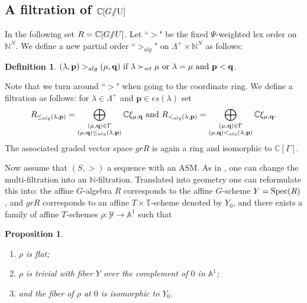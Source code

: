 \documentclass{emsprocart}
\newtheorem{proposition}[theorem]{Proposition}
\theoremstyle{definition}
\newtheorem{definition}[theorem]{Definition}
\begin{document}
\subsection{A filtration of \texorpdfstring{$\mathbb C[G\hbox{/\hskip -3.5pt/U]}$}{the coordinate ring of the flag variety}} \label{algfilt}
In the following set $R=\mathbb C[G{/\hskip -3.5pt/}U]$.
Let ``$>$" be the fixed $\Psi$-weighted lex order on $\mathbb N^N$. We
define a new partial order ``$>_{alg}$" on $\Lambda^+\times\mathbb N^N$ as follows:
\begin{definition}\label{algorder}
$(\lambda,\mathbf p)>_{alg}(\mu,\mathbf q)\hbox{\ if\ }\lambda\succ_{wt} \mu\hbox{\ or\ }\lambda=\mu \hbox{\ and\ }\mathbf p<\mathbf q$.
\end{definition}
Note that we turn around ``$>$" when going to the coordinate ring.
We define a filtration as follows: for $\lambda\in\Lambda^+$ and $\mathbf p\in es(\lambda)$ set
\begin{equation}\label{deg1}
R_{\le_{alg}(\lambda,\mathbf p)}
=\bigoplus_{\substack{(\mu,\mathbf q)\in\Gamma\\ (\mu,\mathbf q)\le_{alg}(\lambda,\mathbf p)}} \mathbb C\xi_{\mu,\mathbf q}
\hbox{\ and\ }
R_{<_{alg}(\lambda,\mathbf p)}=\bigoplus_{\substack{(\mu,\mathbf q)\in\Gamma\\(\mu,\mathbf q)<_{alg}(\lambda,\mathbf p)}} \mathbb C \xi_{\mu,\mathbf q}.
\end{equation}
The associated graded vector space $gr R$ is again a ring and isomorphic to $\mathbb C[\Gamma]$.
\par
Now assume that $(S,>)$ a sequence with an ASM. As in \cite{AB}, one can change the multi-filtration  into an
$\mathbb N$-filtration. Translated into geometry one can reformulate this into: the affine $G$-algebra $R$ corresponds to
the affine $G$-scheme $Y= \hbox{\textrm{Spec}}(R)$, and $gr R$ corresponds to an affine
$T\times \mathbb T$-scheme denoted by $Y_0$, and there exists a family of affine $T$-schemes
$\rho : \mathcal Y\rightarrow \mathbb A^1$ such that

\begin{proposition}\label{Y0}\it
\begin{enumerate}
\item  $\rho$ is flat;
\item $\rho$ is trivial with fiber $Y$ over the complement of $0$ in $\mathbb A^1$;
\item and
the fiber of $\rho$ at $0$ is isomorphic to $Y_0$.
\end{enumerate}
\end{proposition}
\end{document}
